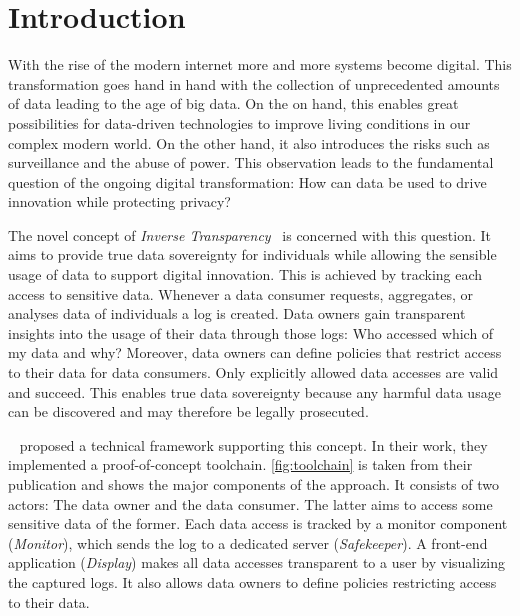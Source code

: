 \documentclass[../main.tex]{subfiles}
\begin{document}
\chapter{Introduction}
With the rise of the modern internet more and more systems become digital.
This transformation goes hand in hand with the collection of unprecedented amounts of data leading to the age of big data.
On the on hand, this enables great possibilities for data-driven technologies to improve living conditions in our complex modern world.
On the other hand, it also introduces the risks such as surveillance and the abuse of power.
This observation leads to the fundamental question of the ongoing digital transformation: How can data be used to drive innovation while protecting privacy?~\cite{Boes2022, Schallmo2016}

The novel concept of \emph{Inverse Transparency}~\cite{Boes2022} is concerned with this question.
It aims to provide true data sovereignty for individuals while allowing the sensible usage of data to support digital innovation.
This is achieved by tracking each access to sensitive data.
Whenever a data consumer requests, aggregates, or analyses data of individuals a log is created.
Data owners gain transparent insights into the usage of their data through those logs:
Who accessed which of my data and why?
Moreover, data owners can define policies that restrict access to their data for data consumers.
Only explicitly allowed data accesses are valid and succeed.
This enables true data sovereignty because any harmful data usage can be discovered and may therefore be legally prosecuted.

\citeauthor{Zieglmeier2021}~\cite{Zieglmeier2021} proposed a technical framework supporting this concept.
In their work, they implemented a proof-of-concept toolchain.
\cref{fig:toolchain} is taken from their publication and shows the major components of the approach.
It consists of two actors: The data owner and the data consumer.
The latter aims to access some sensitive data of the former.
Each data access is tracked by a monitor component (\emph{Monitor}), which sends the log to a dedicated server (\emph{Safekeeper}).
A front-end application (\emph{Display}) makes all data accesses transparent to a user by visualizing the captured logs.
It also allows data owners to define policies restricting access to their data.
\end{document}
